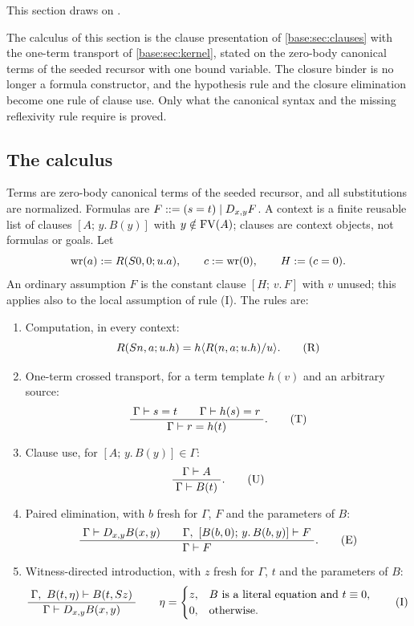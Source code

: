 This section draws on .

The calculus of this section is the clause presentation of \cref{base:sec:clauses} with the
one-term transport of \cref{base:sec:kernel}, stated on the zero-body canonical terms of the
seeded recursor with one bound variable. The closure binder is no longer a formula
constructor, and the hypothesis rule and the closure elimination become one rule of clause
use. Only what the canonical syntax and the missing reflexivity rule require is proved.

\subsection{The calculus}

\begin{definition}\label{ctr:def:five}
Terms are zero-body canonical terms of the seeded recursor, and all substitutions are
normalized. Formulas are $F ::= (s=t)\mid D_{x,y}F$. A context is a finite reusable list of
clauses $[A;\,y.\,B(y)]$ with $y\notin\operatorname{FV}(A)$; clauses are context objects, not formulas or
goals. Let
\[
 \operatorname{wr}(a)\mathrel{:=} R(S 0,0;u.a),\qquad c\mathrel{:=}\operatorname{wr}(0),\qquad
 H\mathrel{:=}(c=0).
\]
An ordinary assumption $F$ is the constant clause $[H;\,v.\,F]$ with $v$ unused; this applies
also to the local assumption of rule (I). The rules are:
\begin{enumerate}
\item Computation, in every context:
\[
 R(S n,a;u.h)=h\langle R(n,a;u.h)/u\rangle . \tag{R}
\]
\item One-term crossed transport, for a term template $h(v)$ and an arbitrary source:
\[
 \dfrac{\;\Gamma\vdash s=t\qquad \Gamma\vdash h(s)=r\;}{\;\Gamma\vdash r=h(t)\;}. \tag{T}
\]
\item Clause use, for $[A;\,y.\,B(y)]\in\Gamma$:
\[
 \dfrac{\;\Gamma\vdash A\;}{\;\Gamma\vdash B(t)\;}. \tag{U}
\]
\item Paired elimination, with $b$ fresh for $\Gamma$, $F$ and the parameters of $B$:
\[
 \dfrac{\;\Gamma\vdash D_{x,y}B(x,y)\qquad \Gamma,\ [B(b,0);\,y.\,B(b,y)]\vdash F\;}{\;\Gamma\vdash F\;}. \tag{E}
\]
\item Witness-directed introduction, with $z$ fresh for $\Gamma$, $t$ and the parameters of
$B$:
\[
 \dfrac{\;\Gamma,\ B(t,\eta)\vdash B(t,S z)\;}{\;\Gamma\vdash D_{x,y}B(x,y)\;}
 \qquad
 \eta=\begin{cases} z, & B \text{ is a literal equation and } t\equiv 0,\\
                    0, & \text{otherwise.}\end{cases} \tag{I}
\]
\end{enumerate}
\end{definition}

